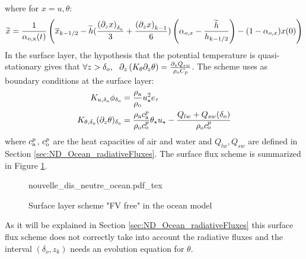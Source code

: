 where for $x=u,\theta$:
\begin{equation}
	\label{eq:ND_Ocean_semiDiscreteEkmanEqPTFVfree}
	\widetilde{x} = \frac{1}{\alpha_{\rm o, x}(t)}
	\left(
	\overline{x}_{k-1/2} -
	\widetilde{h}(\frac{{(\partial_z x)}_{\delta_o}}{3} +
	\frac{{(\partial_z x)}_{k-1}}{6})
	\left(\alpha_{o, x}-\frac{\widetilde{h}}{h_{k-1/2}}\right)
	 - (1 - \alpha_{o, x})x(0)
	\right)
\end{equation}
In the surface layer, the hypothesis that the potential
temperature is quasi-stationary gives that
$\forall z > \delta_o, ~~
\partial_z \left(K_\theta \partial_z \theta \right)
= \frac{\partial_z Q_{sw}}{\rho_{\rm o} C_p}$.
The scheme uses as boundary conditions at the surface layer:
\begin{equation}
\label{eq:ND_Ocean_boundaryConditionFVfree}
\begin{aligned}
	K_{u,\delta_o} \phi_{\delta_o} &= \frac{\rho_{\rm a}}
	{\rho_{\rm o}}
	u_\star^2 e_\tau
	\\
	K_{\theta, \delta_o} (\partial_z \theta)_{\delta_o} &= 
	\frac{\rho_{\rm a} c_{\rm a}^p}{\rho_{\rm o} c_{\rm o}^p}
	\theta_\star u_\star - \frac{Q_{lw} + Q_{sw}(\delta_{o})}{\rho_{\rm o} c_{\rm o}^p}
  \end{aligned}
\end{equation}
where $c_{\rm a}^p$, $c_{\rm o}^p$ are the heat capacities
of air and water and
$Q_{lw}, Q_{sw}$ are defined in Section
\ref{sec:ND_Ocean_radiativeFluxes}.
The surface flux scheme is summarized in Figure
\ref{fig:ND_Ocean_nouvelle_dis_neutre}.
\begin{figure}
	{nouvelle_dis_neutre_ocean.pdf_tex}
	\caption{Surface layer scheme "FV free" in the ocean model}
	\label{fig:ND_Ocean_nouvelle_dis_neutre}
\end{figure}
As it will be explained
in Section \ref{sec:ND_Ocean_radiativeFluxes} this surface flux scheme
does not correctly take into account the radiative fluxes and the
interval $(\delta_o, z_k)$ needs an evolution equation for $\theta$.
